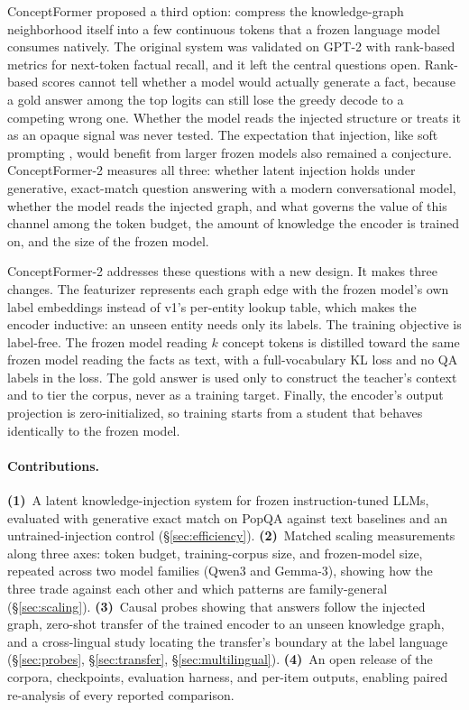 \documentclass{article}
\newcommand{\popqa}{PopQA}
\begin{document}
ConceptFormer \citep{cfv1} proposed a third option: compress the knowledge-graph neighborhood
itself into a few continuous tokens that a frozen language model consumes natively. The
original system was validated on GPT-2 with rank-based metrics for next-token factual recall,
and it left the central questions open. Rank-based scores cannot tell whether a model would
actually generate a fact, because a gold answer among the top logits can still lose the greedy
decode to a competing wrong one. Whether the model reads the injected structure or treats it
as an opaque signal was never tested. The expectation that injection, like soft prompting
\citep{lester}, would benefit from larger frozen models also remained a conjecture.
ConceptFormer-2 measures all three: whether latent injection holds under generative,
exact-match question answering with a modern conversational model, whether the model reads the
injected graph, and what governs the value of this channel among the token budget, the amount
of knowledge the encoder is trained on, and the size of the frozen model.

ConceptFormer-2 addresses these questions with a new design. It makes three changes. The
featurizer represents each graph edge with the frozen model's own label
embeddings instead of v1's per-entity lookup table, which makes the encoder inductive: an
unseen entity needs only its labels. The training objective is label-free. The frozen model
reading $k$ concept tokens is distilled toward the same frozen model reading the facts as
text, with a full-vocabulary KL loss and no QA labels in the loss. The gold answer is used
only to construct the teacher's context and to tier the corpus, never as a training target. Finally,
the encoder's output projection is zero-initialized, so training starts from a student that
behaves identically to the frozen model.

\paragraph{Contributions.}
\textbf{(1)}~A latent knowledge-injection system for frozen instruction-tuned LLMs, evaluated
with generative exact match on \popqa{} against text baselines and an
untrained-injection control (\S\ref{sec:efficiency}).
\textbf{(2)}~Matched scaling measurements along three axes: token budget, training-corpus
size, and frozen-model size, repeated across two model families (Qwen3 and Gemma-3), showing
how the three trade against each other and which patterns are family-general
(\S\ref{sec:scaling}).
\textbf{(3)}~Causal probes showing that answers follow the injected graph, zero-shot transfer
of the trained encoder to an unseen knowledge graph, and a cross-lingual study locating the
transfer's boundary at the label language (\S\ref{sec:probes}, \S\ref{sec:transfer},
\S\ref{sec:multilingual}).
\textbf{(4)}~An open release of the corpora, checkpoints, evaluation harness, and per-item
outputs, enabling paired re-analysis of every reported comparison.
\end{document}
